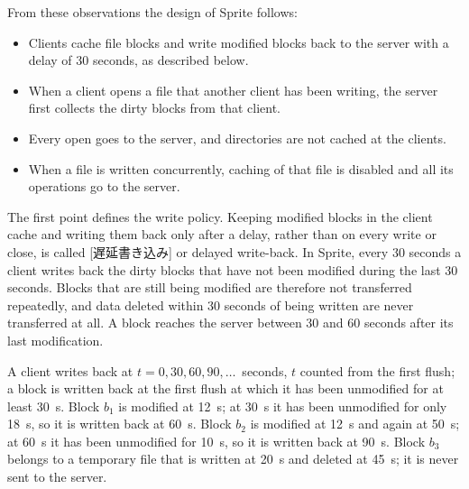 \documentclass[../main.tex]{subfiles}
\begin{document}
From these observations the design of Sprite follows:
\begin{itemize}
  \item Clients cache file blocks and write modified blocks back to the
    server with a delay of 30 seconds, as described below.
  \item When a client opens a file that another client has been writing,
    the server first collects the dirty blocks from that client.
  \item Every open goes to the server, and directories are not cached at
    the clients.
  \item When a file is written concurrently, caching of that file is
    disabled and all its operations go to the server.
\end{itemize}

The first point defines the write policy.  Keeping modified blocks in the
client cache and writing them back only after a delay, rather than on
every write or close, is called [遅延書き込み] or
delayed write-back.  In Sprite, every 30 seconds a client writes back the
dirty blocks that have not been modified during the last 30
seconds.
Blocks that are still being modified are therefore not transferred
repeatedly, and data deleted within 30 seconds of being written are never
transferred at all.  A block reaches the server between 30 and 60 seconds
after its last modification.

\begin{example}
  A client writes back at $t = 0, 30, 60, 90, \ldots$~seconds,
  $t$ counted from the first flush; a block is written back at the first
  flush at which it has been unmodified for at least \SI{30}{\second}.
  Block
  $b_1$ is modified at \SI{12}{\second}; at \SI{30}{\second} it has been
  unmodified for only \SI{18}{\second}, so it is written back at
  \SI{60}{\second}.  Block $b_2$ is modified at \SI{12}{\second} and again
  at \SI{50}{\second}; at \SI{60}{\second} it has been unmodified for
  \SI{10}{\second}, so it is written back at \SI{90}{\second}.  Block
  $b_3$ belongs to a temporary file that is written at \SI{20}{\second}
  and deleted at \SI{45}{\second}; it is never sent to the server.
\end{example}
\end{document}

